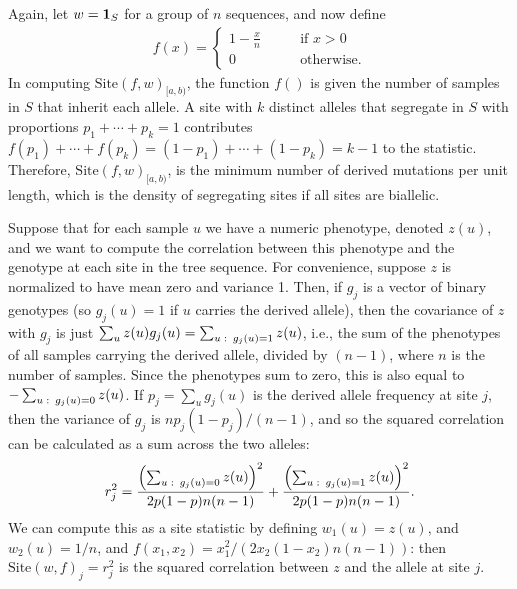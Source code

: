 \documentclass{article}
\newcommand{\site}{\mbox{Site}} %
\newcommand{\iw}{w} %
\begin{document}
\begin{example} \label{ex:segregating_sites}
    Again, let $\iw = \bone_{S}$ for a group of $n$ sequences,
    and now define
    \begin{align*}
        f(x) = \begin{cases}
            1 - \frac{x}{n} \qquad &\text{if } x > 0 \\
            0 \qquad &\text{otherwise} .
        \end{cases}
    \end{align*}
    In computing $\site(f, \iw)_{[a,b)}$, the function $f()$ is given the number of samples in $S$
    that inherit each allele.
    A site with $k$ distinct alleles that segregate in $S$ with proportions $p_1 + \cdots + p_k = 1$
    contributes $f(p_1) + \cdots + f(p_k) = (1 - p_1) + \cdots + (1 - p_k) = k - 1$ to the statistic.
    Therefore, $\site(f, \iw)_{[a,b)}$, is the minimum number of derived mutations per unit length,
    which is the density of segregating sites if all sites are biallelic.
\end{example}

\begin{example} \label{ex:site_correlations}
    Suppose that for each sample $u$ we have a numeric phenotype, denoted $z(u)$,
    and we want to compute the correlation between this phenotype
    and the genotype at each site in the tree sequence.
    For convenience, suppose $z$ is normalized 
    to have mean zero and variance 1.
    Then, if $g_j$ is a vector of binary genotypes (so $g_j(u) = 1$ if $u$ carries the derived allele),
    then the covariance of $z$ with $g_j$ is just $\sum_u z(u) g_j(u) = \sum_{u \,\colon\, g_j(u) = 1} z(u)$,
    i.e., the sum of the phenotypes of all samples carrying the derived allele,
    divided by $(n - 1)$, where $n$ is the number of samples.
    Since the phenotypes sum to zero, this is also equal to 
    $- \sum_{u \,\colon\, g_j(u) = 0} z(u)$.
    If $p_j = \sum_u g_j(u)$ is the derived allele frequency at site $j$,
    then the variance of $g_j$ is $n p_j (1-p_j) / (n-1)$,
    and so the squared correlation can be calculated as a sum across the two alleles:
    \begin{align*}
        r_j^2 =
        \frac{\left( \sum_{u \,\colon\, g_j(u) = 0} z(u)\right)^2}{2p(1-p)n(n-1)} 
        + \frac{\left( \sum_{u \,\colon\, g_j(u) = 1} z(u)\right)^2}{2p(1-p)n(n-1)}  .
    \end{align*}
    We can compute this as a site statistic by defining $\iw_{1}(u) = z(u)$, and $\iw_{2}(u) = 1/n$,
    and $f(x_1, x_2) = x_1^2 / (2 x_2 (1 - x_2) n (n-1))$:
    then $\site(\iw, f)_j = r_j^2$ is the squared correlation between $z$ and the allele at site $j$.
\end{example}
\end{document}
